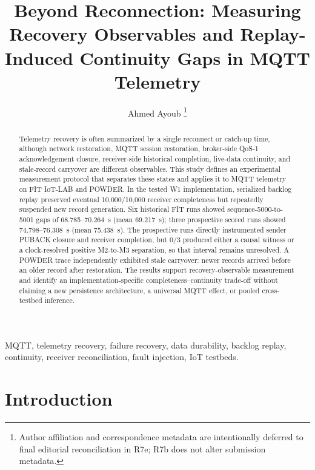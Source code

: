\documentclass[journal]{IEEEtran}
\begin{document}
\title{Beyond Reconnection: Measuring Recovery Observables and Replay-Induced Continuity Gaps in MQTT Telemetry}

\author{Ahmed Ayoub%
\thanks{Author affiliation and correspondence metadata are intentionally deferred to final editorial reconciliation in R7e; R7b does not alter submission metadata.}}

\maketitle

\begin{abstract}
Telemetry recovery is often summarized by a single reconnect or catch-up time, although network restoration, MQTT session restoration, broker-side QoS-1 acknowledgement closure, receiver-side historical completion, live-data continuity, and stale-record carryover are different observables. This study defines an experimental measurement protocol that separates these states and applies it to MQTT telemetry on FIT IoT-LAB and POWDER. In the tested W1 implementation, serialized backlog replay preserved eventual 10,000/10,000 receiver completeness but repeatedly suspended new record generation. Six historical FIT runs showed sequence-5000-to-5001 gaps of 68.785--70.264~s (mean 69.217~s); three prospective scored runs showed 74.798--76.308~s (mean 75.438~s). The prospective runs directly instrumented sender PUBACK closure and receiver completion, but 0/3 produced either a causal witness or a clock-resolved positive M2-to-M3 separation, so that interval remains unresolved. A POWDER trace independently exhibited stale carryover: newer records arrived before an older record after restoration. The results support recovery-observable measurement and identify an implementation-specific completeness--continuity trade-off without claiming a new persistence architecture, a universal MQTT effect, or pooled cross-testbed inference.
\end{abstract}

\begin{IEEEkeywords}
MQTT, telemetry recovery, failure recovery, data durability, backlog replay, continuity, receiver reconciliation, fault injection, IoT testbeds.
\end{IEEEkeywords}

\section{Introduction}
\label{sec:introduction}
\end{document}

